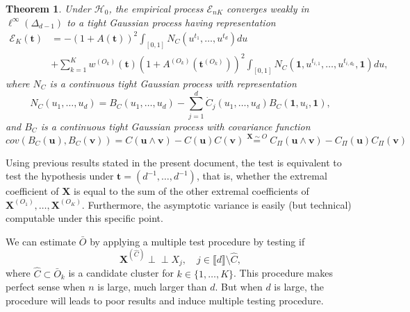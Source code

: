 \documentclass[11pt]{article}
\newtheorem{theorem}{Theorem}
\theoremstyle{definition}
\newcommand{\indep}{\perp \!\!\! \perp}
\begin{document}
	\begin{theorem}
		\label{thm:weak_conv}
		Under $\mathcal{H}_0$, the empirical process $\mathcal{E}_{nK}$ converges weakly in $\ell^{\infty}(\Delta_{d-1})$ to a tight Gaussian process having representation
		\begin{align*}
			\mathcal{E}_K(\textbf{t}) &= -\left(1+A(\textbf{t})\right)^2 \int_{[0,1]} N_C(u^{t_1}, \dots, u^{t_d})du \\ &+ \sum_{k=1}^K w^{(O_k)}(\textbf{t})\left(1+A^{(O_k)}(\textbf{t}^{(O_k)})\right)^2 \int_{[0,1]} N_C(\textbf{1},u^{t_{i,1}}, \dots, u^{t_{i,d_k}}, \textbf{1})du,
		\end{align*}
		where $N_C$ is a continuous tight Gaussian process with representation 
		\begin{equation*}
			N_C(u_1,\dots,u_d) = B_C(u_1, \dots, u_d) - \sum_{j=1}^d \dot{C}_j(u_1, \dots, u_d) B_C(\textbf{1}, u_i, \textbf{1}),
		\end{equation*}
		and $B_C$ is a continuous tight Gaussian process with covariance function
		\begin{equation*}
			cov(B_C(\textbf{u}), B_C(\textbf{v})) = C(\textbf{u} \wedge \textbf{v}) - C(\textbf{u})C(\textbf{v}) \overset{\textbf{X}\sim O}{=} C_{\Pi}(\textbf{u} \wedge \textbf{v}) - C_{\Pi}(\textbf{u})C_{\Pi}(\textbf{v})
		\end{equation*}
	\end{theorem}
	Using previous results stated in the present document, the test is equivalent to test the hypothesis under $\textbf{t} = (d^{-1},\dots,d^{-1})$, that is, whether the extremal coefficient of $\textbf{X}$ is equal to the sum of the other extremal coefficients of $\textbf{X}^{(O_1)}, \dots, \textbf{X}^{(O_K)}$. Furthermore, the asymptotic variance is easily (but technical) computable under this specific point.
	
	We can estimate $\bar{O}$ by applying a multiple test procedure by testing if
	\begin{equation}
		\textbf{X}^{(\hat{C})} \indep X_j, \quad j \in \llbracket d \rrbracket \setminus \hat{C},
	\end{equation}	 
	where $\hat{C} \subset \bar{O}_k$ is a candidate cluster for $k \in \{1,\dots,K\}$. This procedure makes perfect sense when $n$ is large, much larger than $d$. But when $d$ is large, the procedure will leads to poor results and induce multiple testing procedure.
	
\end{document}
